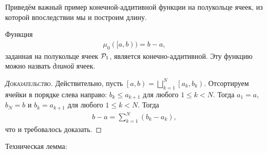 \documentclass[../measure-theory.tex]{subfiles}
\begin{document}
Приведём важный пример конечной-аддитивной функции на полукольце ячеек, из которой впоследствии мы и построим длину.

\begin{exmpl}
 Функция \begin{align*}
  \mu_0([a, b)) = b - a
 ,\end{align*} заданная на полукольце ячеек $\mathcal{P}_1$, является конечно-аддитивной. Эту функцию можно назвать \textit{длиной} ячеек.
\end{exmpl}
\begin{proof}[\normalfont\textsc{Доказательство}]
 Действительно, пусть $\left[a, b\right) = \bigsqcup_{k=1}^{N} \left[a_k, b_k\right)$. Отсортируем ячейки в порядке слева направо: $b_k \leqslant {a_{k+1}}$ для любого $1 \leqslant k < N$. Тогда $a_1 = a$, $b_N = b$ и $b_k = a_{k+1}$ для любого $1 \leqslant k < N$. Тогда
 \begin{align*}
  b - a = \sum_{k=1}^{N} (b_k - a_k)
 ,\end{align*} что и требовалось доказать.
\end{proof}

Техническая лемма:
\end{document}
